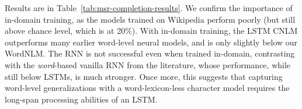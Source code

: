 Results are in Table~\ref{tab:msr-completion-results}.  We
confirm the importance of in-domain training, as the models
trained on Wikipedia perform poorly (but still above chance level,
which is at 20\%).  With in-domain training, the LSTM CNLM outperforms
many earlier word-level neural models, and is only slightly below our
WordNLM. %
The RNN is not successful even when trained in-domain,
contrasting with the \emph{word}-based vanilla RNN from the
literature, whose performance, while still below LSTMs, is much
stronger. Once more, this suggests that capturing word-level generalizations with a word-lexicon-less character model requires the long-span processing abilities of an LSTM.



